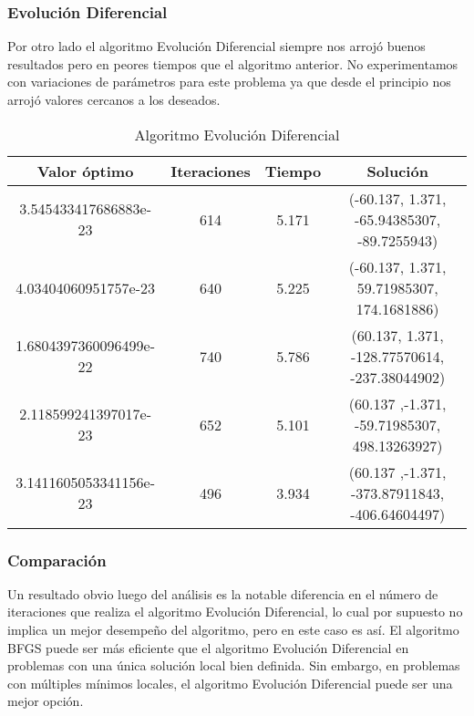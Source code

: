 \documentclass{article}
\begin{document}
\subsubsection{Evolución Diferencial}

Por otro lado el algoritmo Evolución Diferencial siempre nos arrojó buenos 
resultados pero en peores tiempos que el algoritmo anterior. No experimentamos
con variaciones de parámetros para este problema ya que desde el principio 
nos arrojó valores cercanos a los deseados.

\newpage

\begin{table}[ht]
	\begin{center}
		\begin{tabular}{|c|c|c|c|}
			\hline
			\textbf{Valor óptimo}  & \textbf{Iteraciones} & \textbf{Tiempo} & \textbf{Solución}   \\
			\hline
			3.545433417686883e-23  & 614                  & 5.171           &  (-60.137, 1.371, -65.94385307, -89.7255943)   \\
			4.03404060951757e-23   & 640                  & 5.225           &  (-60.137, 1.371, 59.71985307, 174.1681886)   \\
			1.6804397360096499e-22 & 740                  & 5.786           &  (60.137, 1.371, -128.77570614, -237.38044902) \\
			2.118599241397017e-23  & 652                  & 5.101           &  (60.137 ,-1.371, -59.71985307, 498.13263927)  \\
			3.1411605053341156e-23 & 496                  & 3.934           &  (60.137 ,-1.371, -373.87911843, -406.64604497)\\
			\hline
		\end{tabular}
		\caption{Algoritmo Evolución Diferencial}
	\end{center}
\end{table}

\subsubsection{Comparación}

Un resultado obvio luego del análisis es la notable diferencia en el número de 
iteraciones que realiza el algoritmo Evolución Diferencial, lo cual por 
supuesto no implica un mejor desempeño del algoritmo, pero en este caso es así. 
El algoritmo BFGS puede ser más eficiente que el algoritmo Evolución 
Diferencial en problemas con una única solución local bien definida. Sin 
embargo, en problemas con múltiples mínimos locales, el algoritmo Evolución 
Diferencial puede ser una mejor opción.
\end{document}
